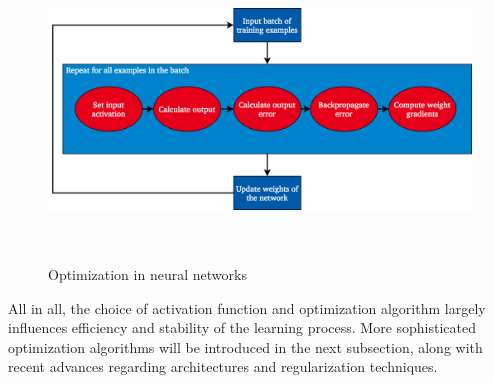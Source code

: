 \begin{figure}[h]
  \centering
  \includegraphics[height=8cm]{img/nn_optimization_3}
  \caption{Optimization in neural networks}
\label{fig:grad_desc}
\end{figure}

All in all, the choice of activation function and optimization algorithm largely
influences efficiency and stability of the learning process.
More sophisticated optimization algorithms will be introduced in the next
subsection, along with recent advances regarding architectures and
regularization techniques.
